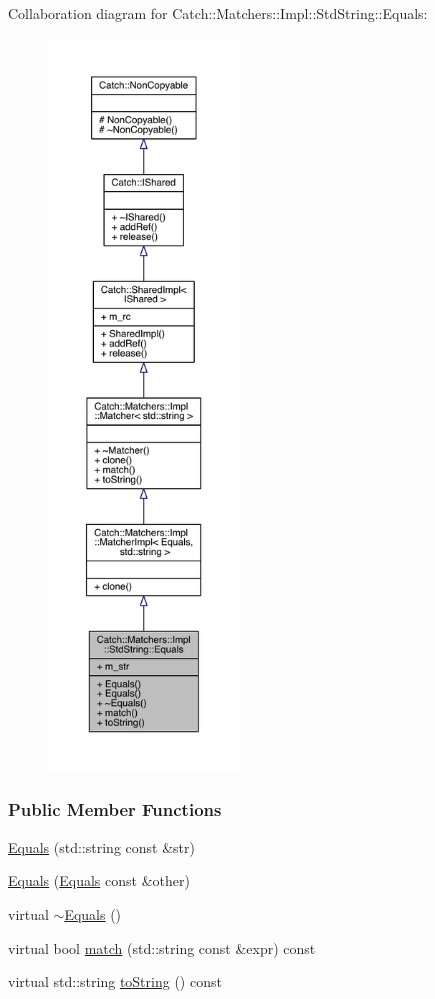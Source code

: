 Collaboration diagram for Catch\+:\+:Matchers\+:\+:Impl\+:\+:Std\+String\+:\+:Equals\+:\nopagebreak
\begin{figure}[H]
\begin{center}
\leavevmode
\includegraphics[height=550pt]{a00355}
\end{center}
\end{figure}
\subsubsection*{Public Member Functions}
\begin{DoxyCompactItemize}
\item 
\hyperlink{a00017_a1bd99b381c6116a02b1e3ca200ca920c}{Equals} (std\+::string const \&str)
\item 
\hyperlink{a00017_acaa97de06aedf363ae803d65a975f5e4}{Equals} (\hyperlink{a00017}{Equals} const \&other)
\item 
virtual \hyperlink{a00017_ad34af04f636ec84d7c613ead32f20c3f}{$\sim$\+Equals} ()
\item 
virtual bool \hyperlink{a00017_a00c8259a76c24da669e116662ededc70}{match} (std\+::string const \&expr) const 
\item 
virtual std\+::string \hyperlink{a00017_a7a09449ff2f858981caf3b1f6c36d270}{to\+String} () const 
\end{DoxyCompactItemize}
